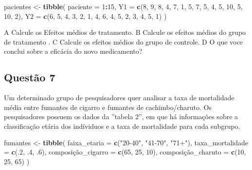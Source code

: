 \documentclass[
]{article}
\newenvironment{Shaded}{\begin{snugshade}}{\end{snugshade}}
\newcommand{\DataTypeTok}[1]{\textcolor[rgb]{0.13,0.29,0.53}{#1}}
\newcommand{\DecValTok}[1]{\textcolor[rgb]{0.00,0.00,0.81}{#1}}
\newcommand{\FloatTok}[1]{\textcolor[rgb]{0.00,0.00,0.81}{#1}}
\newcommand{\KeywordTok}[1]{\textcolor[rgb]{0.13,0.29,0.53}{\textbf{#1}}}
\newcommand{\NormalTok}[1]{#1}
\newcommand{\OperatorTok}[1]{\textcolor[rgb]{0.81,0.36,0.00}{\textbf{#1}}}
\newcommand{\StringTok}[1]{\textcolor[rgb]{0.31,0.60,0.02}{#1}}
\begin{document}
\begin{Shaded}
\begin{Highlighting}[]
\NormalTok{pacientes <-}\StringTok{ }\KeywordTok{tibble}\NormalTok{(}
  \DataTypeTok{paciente =} \DecValTok{1}\OperatorTok{:}\DecValTok{15}\NormalTok{,}
  \DataTypeTok{Y1 =} \KeywordTok{c}\NormalTok{(}\DecValTok{8}\NormalTok{, }\DecValTok{9}\NormalTok{, }\DecValTok{8}\NormalTok{, }\DecValTok{4}\NormalTok{, }\DecValTok{7}\NormalTok{, }\DecValTok{1}\NormalTok{, }\DecValTok{5}\NormalTok{, }\DecValTok{7}\NormalTok{, }\DecValTok{5}\NormalTok{, }\DecValTok{4}\NormalTok{, }\DecValTok{5}\NormalTok{, }\DecValTok{10}\NormalTok{, }\DecValTok{5}\NormalTok{, }\DecValTok{10}\NormalTok{, }\DecValTok{2}\NormalTok{),}
  \DataTypeTok{Y2 =} \KeywordTok{c}\NormalTok{(}\DecValTok{6}\NormalTok{, }\DecValTok{5}\NormalTok{, }\DecValTok{4}\NormalTok{, }\DecValTok{3}\NormalTok{, }\DecValTok{2}\NormalTok{, }\DecValTok{1}\NormalTok{, }\DecValTok{4}\NormalTok{, }\DecValTok{6}\NormalTok{, }\DecValTok{4}\NormalTok{, }\DecValTok{5}\NormalTok{, }\DecValTok{2}\NormalTok{, }\DecValTok{3}\NormalTok{, }\DecValTok{4}\NormalTok{, }\DecValTok{5}\NormalTok{, }\DecValTok{1}\NormalTok{)}
\NormalTok{)}
\end{Highlighting}
\end{Shaded}

A Calcule os Efeitos médios de tratamento. B Calcule os efeitos médios
do grupo de tratamento . C Calcule os efeitos médios do grupo de
controle. D O que voce conclui sobre a eficácia do novo medicamento?

\hypertarget{questuxe3o-7}{%
\subsection{Questão 7}\label{questuxe3o-7}}

Um determinado grupo de pesquisadores quer analisar a taxa de
mortalidade média entre fumantes de cigarro e fumantes de
cachimbo/charuto. Os pesquisadores possuem os dados da ''tabela 2'', em
que há informações sobre a classificação etária dos indíviduos e a taxa
de mortalidade para cada subgrupo.

\begin{Shaded}
\begin{Highlighting}[]
\NormalTok{fumantes <-}\StringTok{ }\KeywordTok{tibble}\NormalTok{(}
  \DataTypeTok{faixa_etaria =} \KeywordTok{c}\NormalTok{(}\StringTok{"20-40"}\NormalTok{, }\StringTok{"41-70"}\NormalTok{, }\StringTok{"71+"}\NormalTok{),}
  \DataTypeTok{taxa_mortalidade =} \KeywordTok{c}\NormalTok{(.}\DecValTok{2}\NormalTok{, }\FloatTok{.4}\NormalTok{, }\FloatTok{.6}\NormalTok{),}
\NormalTok{  composiçã}\DataTypeTok{o_cigarro =} \KeywordTok{c}\NormalTok{(}\DecValTok{65}\NormalTok{, }\DecValTok{25}\NormalTok{, }\DecValTok{10}\NormalTok{),}
\NormalTok{  composiçã}\DataTypeTok{o_charuto =} \KeywordTok{c}\NormalTok{(}\DecValTok{10}\NormalTok{, }\DecValTok{25}\NormalTok{, }\DecValTok{65}\NormalTok{)}
\NormalTok{)}
\end{Highlighting}
\end{Shaded}
\end{document}
